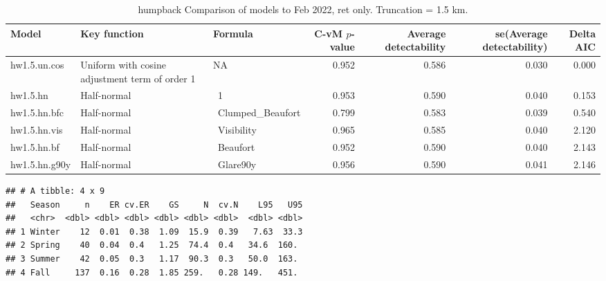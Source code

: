 \documentclass[
]{article}
\begin{document}
\begin{landscape}\begin{table}

\caption{\label{tab:feb}humpback  Comparison of models to Feb 2022, ret only. Truncation = 1.5 km.}
\centering
\begin{tabular}[t]{l|l|l|r|r|r|r}
\hline
Model & Key function & Formula & C-vM $p$-value & Average detectability & se(Average detectability) & Delta AIC\\
\hline
hw1.5.un.cos & Uniform with cosine adjustment term of order 1 & NA & 0.952 & 0.586 & 0.030 & 0.000\\
\hline
hw1.5.hn & Half-normal & ~1 & 0.953 & 0.590 & 0.040 & 0.153\\
\hline
hw1.5.hn.bfc & Half-normal & ~Clumped_Beaufort & 0.799 & 0.583 & 0.039 & 0.540\\
\hline
hw1.5.hn.vis & Half-normal & ~Visibility & 0.965 & 0.585 & 0.040 & 2.120\\
\hline
hw1.5.hn.bf & Half-normal & ~Beaufort & 0.952 & 0.590 & 0.040 & 2.143\\
\hline
hw1.5.hn.g90y & Half-normal & ~Glare90y & 0.956 & 0.590 & 0.041 & 2.146\\
\hline
\end{tabular}
\end{table}
\end{landscape}

\begin{verbatim}
## # A tibble: 4 x 9
##   Season     n    ER cv.ER    GS     N  cv.N    L95   U95
##   <chr>  <dbl> <dbl> <dbl> <dbl> <dbl> <dbl>  <dbl> <dbl>
## 1 Winter    12  0.01  0.38  1.09  15.9  0.39   7.63  33.3
## 2 Spring    40  0.04  0.4   1.25  74.4  0.4   34.6  160. 
## 3 Summer    42  0.05  0.3   1.17  90.3  0.3   50.0  163. 
## 4 Fall     137  0.16  0.28  1.85 259.   0.28 149.   451.
\end{verbatim}
\end{document}
